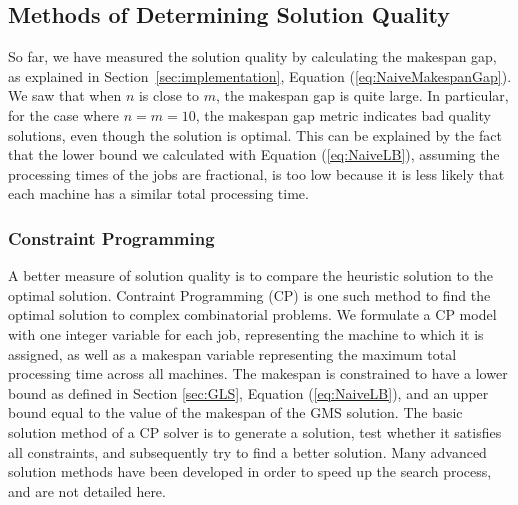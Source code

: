 \documentclass[12pt,a4paper,reqno]{article}
\begin{document}
\newpage
\subsection{Methods of Determining Solution Quality} \label{subsec:SolQual}
So far, we have measured the solution quality by calculating the makespan gap, as explained in Section~\ref{sec:implementation}, Equation (\ref{eq:NaiveMakespanGap}). We saw that when $n$ is close to $m$, the makespan gap is quite large. In particular, for the case where $n=m=10$, the makespan gap metric indicates bad quality solutions, even though the solution is optimal. This can be explained by the fact that the lower bound we calculated with Equation (\ref{eq:NaiveLB}), assuming the processing times of the jobs are fractional, is too low because it is less likely that each machine has a similar total processing time.  \\



\subsubsection{Constraint Programming}
A better measure of solution quality is to compare the heuristic solution to the optimal solution. Contraint Programming (CP) is one such method to find the optimal solution to complex combinatorial problems. We formulate a CP model with one integer variable for each job, representing the machine to which it is assigned, as well as a makespan variable representing the maximum total processing time across all machines. The makespan is constrained to have a lower bound as defined in Section \ref{sec:GLS}, Equation (\ref{eq:NaiveLB}), and an upper bound equal to the value of the makespan of the GMS solution. The basic solution method of a CP solver is to generate a solution, test whether it satisfies all constraints, and subsequently try to find a better solution. Many advanced solution methods have been developed in order to speed up the search process, and are not detailed here.\\
\end{document}
